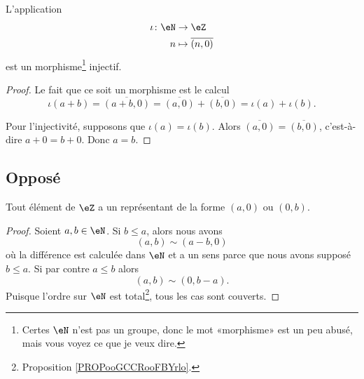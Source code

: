 \begin{proposition}		\label{PROPooVMGYooUWsbSr}
	L'application
	\begin{equation}
		\begin{aligned}
			\iota\colon \eN & \to \eZ                    \\
			n               & \mapsto \overline{ (n,0) }
		\end{aligned}
	\end{equation}
	est un morphisme\footnote{Certes \( \eN\) n'est pas un groupe, donc le mot «morphisme» est un peu abusé, mais vous voyez ce que je veux dire.} injectif.
\end{proposition}

\begin{proof}
	Le fait que ce soit un morphisme est le calcul
	\begin{equation}
		\iota(a+b)=\overline{ (a+b,0) }=\overline{ (a,0) }+\overline{ (b,0) }=\iota(a)+\iota(b).
	\end{equation}

	Pour l'injectivité, supposons que \( \iota(a)=\iota(b)\). Alors \( \overline{ (a,0) }=\overline{ (b,0) }\), c'est-à-dire \( a+0=b+0\). Donc \( a=b\).
\end{proof}

\subsection{Opposé}
\label{SUBooEntiersRelatifsOpposes}

\begin{lemma}       \label{LEMooSABNooZZDIes}
	Tout élément de \( \eZ\) a un représentant de la forme \( (a,0)\) ou \( (0,b)\).
\end{lemma}

\begin{proof}
	Soient \( a,b\in \eN\). Si \( b\leq a\), alors nous avons
	\begin{equation}
		(a,b)\sim(a-b,0)
	\end{equation}
	où la différence est calculée dans \( \eN\) et a un sens parce que nous avons supposé \( b\leq a\). Si par contre \( a\leq b\) alors
	\begin{equation}
		(a,b)\sim(0,b-a).
	\end{equation}
	Puisque l'ordre sur \( \eN\) est total\footnote{Proposition \ref{PROPooGCCRooFBYrlo}.}, tous les cas sont couverts.
\end{proof}

